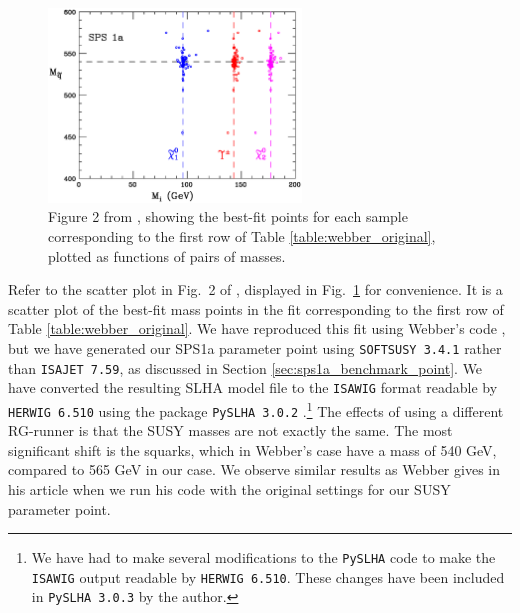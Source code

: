 \documentclass[twoside,english]{uiofysmaster}
\begin{document}
\begin{figure}[htbp]
  \centering
  \includegraphics[width=0.6\textwidth]{figures/webber_rec_table/sps1a_fits.eps} 
  \caption{Figure 2 from \cite{Webber:2009vm}, showing the best-fit points for each sample corresponding to the first row of Table \ref{table:webber_original}, plotted as functions of pairs of masses.}
  \label{fig:webber_scatter}
\end{figure}
Refer to the scatter plot in Fig.\ 2 of \cite{Webber:2009vm}, displayed in Fig.\ \ref{fig:webber_scatter} for convenience. It is a scatter plot of the best-fit mass points in the fit corresponding to the first row of Table \ref{table:webber_original}. We have reproduced this fit using Webber's code \cite{Webber:epost}, but we have generated our SPS1a parameter point using {\tt SOFTSUSY 3.4.1} \cite{Allanach:2001kg} rather than {\tt ISAJET 7.59}, as discussed in Section \ref{sec:sps1a_benchmark_point}. We have converted the resulting SLHA \cite{Skands:2003cj} model file to the {\tt ISAWIG} format readable by {\tt HERWIG 6.510} using the package {\tt PySLHA 3.0.2} \cite{Buckley:2013jua}.\footnote{We have had to make several modifications to the {\tt PySLHA} code to make the {\tt ISAWIG} output readable by {\tt HERWIG 6.510}. These changes have been included in {\tt PySLHA 3.0.3} by the author.} The effects of using a different RG-runner is that the SUSY masses are not exactly the same. The most significant shift is the squarks, which in Webber's case have a mass of 540 GeV, compared to 565 GeV in our case. We observe similar results as Webber gives in his article when we run his code with the original settings for our SUSY parameter point. 
\end{document}
